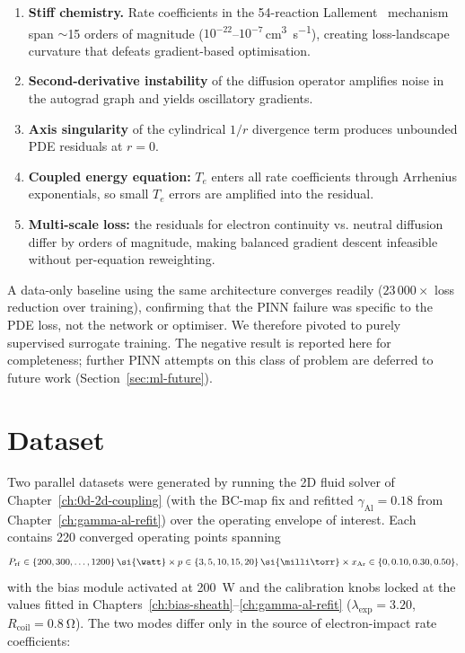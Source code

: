 \begin{enumerate}[itemsep=2pt,topsep=2pt]
  \item \textbf{Stiff chemistry.} Rate coefficients in the 54-reaction
  Lallement~\cite{lallement2009} mechanism span $\sim$15 orders of magnitude
  ($10^{-22}$--$10^{-7}$\,\si{\centi\meter\cubed\per\second}), creating
  loss-landscape curvature that defeats gradient-based optimisation.
  \item \textbf{Second-derivative instability} of the diffusion operator
  amplifies noise in the autograd graph and yields oscillatory gradients.
  \item \textbf{Axis singularity} of the cylindrical $1/r$ divergence term
  produces unbounded PDE residuals at $r=0$.
  \item \textbf{Coupled energy equation:} $T_e$ enters all rate coefficients
  through Arrhenius exponentials, so small $T_e$ errors are amplified into
  the residual.
  \item \textbf{Multi-scale loss:} the residuals for electron continuity vs.
  neutral diffusion differ by orders of magnitude, making balanced gradient
  descent infeasible without per-equation reweighting.
\end{enumerate}

A data-only baseline using the same architecture converges readily
($23\,000\times$ loss reduction over training), confirming that the PINN
failure was specific to the PDE loss, not the network or optimiser. We
therefore pivoted to purely supervised surrogate training. The negative result
is reported here for completeness; further PINN attempts on this class of
problem are deferred to future work
(Section~\ref{sec:ml-future}).

\section{Dataset}
\label{sec:ml-dataset}

Two parallel datasets were generated by running the 2D fluid solver of
Chapter~\ref{ch:0d-2d-coupling} (with the BC-map fix and refitted
$\gamma_\mathrm{Al}=0.18$ from Chapter~\ref{ch:gamma-al-refit}) over the
operating envelope of interest. Each contains 220 converged operating points
spanning
\begin{equation}
  P_\mathrm{rf} \in \{200, 300, \dots, 1200\}\,\si{\watt} \times
  p \in \{3, 5, 10, 15, 20\}\,\si{\milli\torr} \times
  x_\mathrm{Ar} \in \{0, 0.10, 0.30, 0.50\},
\end{equation}
with the bias module activated at \SI{200}{\watt} and the calibration knobs
locked at the values fitted in Chapters~\ref{ch:bias-sheath}--\ref{ch:gamma-al-refit}
($\lambda_\mathrm{exp}=3.20$, $R_\mathrm{coil}=\SI{0.8}{\ohm}$). The two modes
differ only in the source of electron-impact rate coefficients:

